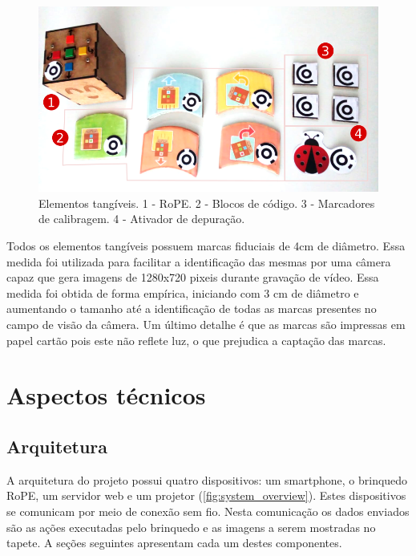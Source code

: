 \begin{figure}
\centering
        \includegraphics[width=.9\linewidth,fbox]{figs/tangible_elements.png}
        \caption{Elementos tangíveis. 1 - RoPE. 2 - Blocos de código. 3 - Marcadores de calibragem. 4 - Ativador de depuração.}
        \label{fig:tangible_elements}
\end{figure}
Todos os elementos tangíveis possuem marcas fiduciais de 4cm de diâmetro. Essa medida foi utilizada para facilitar a identificação das mesmas por uma câmera capaz que gera imagens de 1280x720 pixeis durante gravação de vídeo. Essa medida foi obtida de forma empírica, iniciando com 3 cm de diâmetro e aumentando o tamanho até a identificação de todas as marcas presentes no campo de visão da câmera. Um último detalhe é que as marcas são impressas em papel cartão pois este não reflete luz, o que prejudica a captação das marcas.

\section{Aspectos técnicos}
\label{sec:detalhes_tecnicos}
\subsection{Arquitetura}
A arquitetura do projeto possui quatro dispositivos: um smartphone, o brinquedo RoPE, um servidor web e um projetor (\autoref{fig:system_overview}). Estes dispositivos se comunicam por meio de conexão sem fio. Nesta comunicação os dados enviados são as ações executadas pelo brinquedo e as imagens a serem mostradas no tapete.  A seções seguintes apresentam cada um destes componentes.

